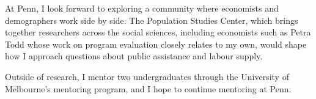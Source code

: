 \documentclass[11pt]{article}
\begin{document}


At Penn, I look forward to exploring a community where economists and demographers work side by side. The Population Studies Center, which brings together researchers across the social sciences, including economists such as Petra Todd whose work on program evaluation closely relates to my own, would shape how I approach questions about public assistance and labour supply.
\psbreak

Outside of research, I mentor two undergraduates through the University of Melbourne's mentoring program, and I hope to continue mentoring at Penn.


\end{document}
